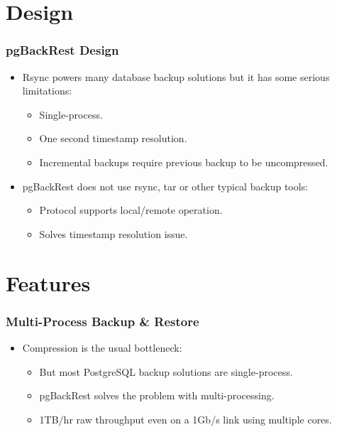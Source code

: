 \section{Design}

\begin{frame}
    \frametitle{pgBackRest Design}

    \begin{itemize}
        \item Rsync powers many database backup solutions but it has some serious limitations:\pause

        \begin{itemize}
            \item Single-process.\pause
            \item One second timestamp resolution.\pause
            \item Incremental backups require previous backup to be uncompressed.\pause
        \end{itemize}

        \item pgBackRest does not use rsync, tar or other typical backup tools:\pause

        \begin{itemize}
            \item Protocol supports local/remote operation.\pause
            \item Solves timestamp resolution issue.
        \end{itemize}
    \end{itemize}
\end{frame}

\section{Features}

\begin{frame}
    \frametitle{Multi-Process Backup \& Restore}

    \begin{itemize}
        \item Compression is the usual bottleneck:\pause

        \begin{itemize}
            \item But most PostgreSQL backup solutions are single-process.\pause
            \item pgBackRest solves the problem with multi-processing.\pause
            \item 1TB/hr raw throughput even on a 1Gb/s link using multiple cores.
        \end{itemize}
    \end{itemize}
\end{frame}


